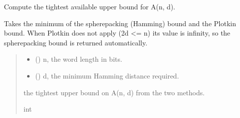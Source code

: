 \documentclass[letterpaper,10pt,english]{sphinxmanual}
\begin{document}

\begin{fulllineitems}
\label{\detokenize{index:hammindist.functions.upper_bound}}
\pysigstartsignatures
\pysiglinewithargsret
{}
{\sphinxparamcomma {}}
{}
\pysigstopsignatures
\sphinxAtStartPar
Compute the tightest available upper bound for A(n, d).

\sphinxAtStartPar
Takes the minimum of the sphere\sphinxhyphen{}packing (Hamming) bound and the
Plotkin bound. When Plotkin does not apply (2d \textless{}= n) its value is
infinity, so the sphere\sphinxhyphen{}packing bound is returned automatically.
\begin{quote}\begin{description}
\begin{itemize}
\item {} 
\sphinxAtStartPar
{} () \textendash{} n, the word length in bits.

\item {} 
\sphinxAtStartPar
{} () \textendash{} d, the minimum Hamming distance required.

\end{itemize}

\sphinxAtStartPar
the tightest upper bound on A(n, d) from the two methods.

\sphinxAtStartPar
int

\end{description}\end{quote}

\end{fulllineitems}



\renewcommand{\indexname}{Python Module Index}
\begin{sphinxtheindex}
\let\bigletter\sphinxstyleindexlettergroup
\bigletter{h}
\item\relax{}
\end{sphinxtheindex}

\renewcommand{\indexname}{Index}
\printindex
\end{document}
